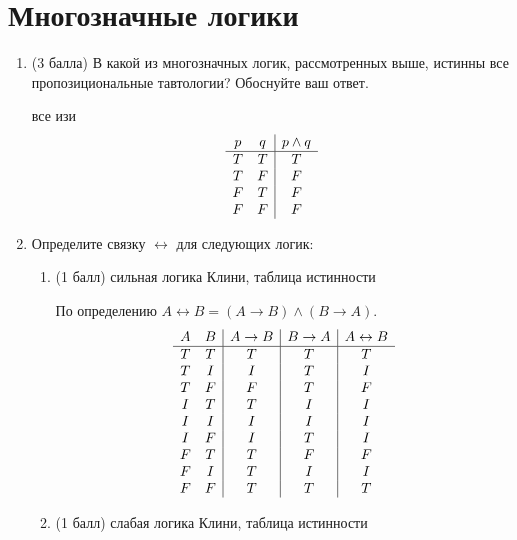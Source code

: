 \section{Многозначные логики}
\begin{enumerate}
  \item (3 балла) В какой из многозначных логик, рассмотренных выше, истинны все пропозициональные тавтологии? Обоснуйте ваш ответ.
  \begin{solution}
    все изи
    \begin{displaymath}
      \begin{array}{c c|c}
      p & q & p \land q\\
      \hline
      T & T & T\\
      T & F & F\\
      F & T & F\\
      F & F & F\\
      \end{array}
      \end{displaymath}
  \end{solution}
  \item Определите связку $\leftrightarrow$ для следующих логик:
  \begin{enumerate}
    \item (1 балл) сильная логика Клини, таблица истинности
    \begin{solution}
      По определению $A \leftrightarrow B = (A \rightarrow B) \land (B \rightarrow A)$.
      \begin{displaymath}
      \begin{array}{c c|c|c|c}
        A & B & A \rightarrow B & B \rightarrow A & A \leftrightarrow B\\
        \hline
        T & T & T & T & T\\
        T & I & I & T & I\\
        T & F & F & T & F\\
        I & T & T & I & I\\
        I & I & I & I & I\\
        I & F & I & T & I\\
        F & T & T & F & F\\
        F & I & T & I & I\\
        F & F & T & T & T
      \end{array}
      \end{displaymath}
    \end{solution}
    \item (1 балл) слабая логика Клини, таблица истинности

\end{enumerate}
\end{enumerate}
